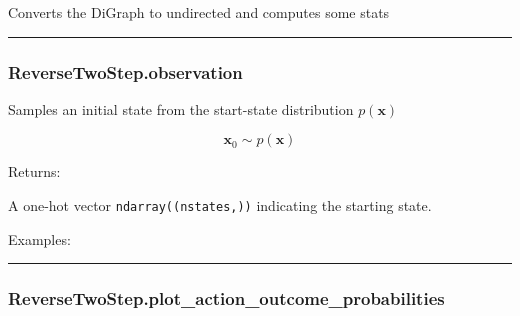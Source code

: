 \begin{Shaded}
\begin{Highlighting}[]
\NormalTok{)}
\end{Highlighting}
\end{Shaded}

Converts the DiGraph to undirected and computes some stats

\begin{center}\rule{0.5\linewidth}{\linethickness}\end{center}

\hypertarget{reversetwostep.observation}{%
\subsubsection{ReverseTwoStep.observation}\label{reversetwostep.observation}}

\begin{Shaded}
\begin{Highlighting}[]
\NormalTok{)}
\end{Highlighting}
\end{Shaded}

Samples an initial state from the start-state distribution
\(p(\mathbf x)\)

\[
\mathbf x_0 \sim p(\mathbf x)
\]

Returns:

A one-hot vector \texttt{ndarray((nstates,))} indicating the starting
state.

Examples:

\begin{Shaded}
\begin{Highlighting}[]
\OperatorTok{=}
\end{Highlighting}
\end{Shaded}

\begin{center}\rule{0.5\linewidth}{\linethickness}\end{center}

\hypertarget{reversetwostep.plot_action_outcome_probabilities}{%
\subsubsection{ReverseTwoStep.plot\_action\_outcome\_probabilities}\label{reversetwostep.plot_action_outcome_probabilities}}

